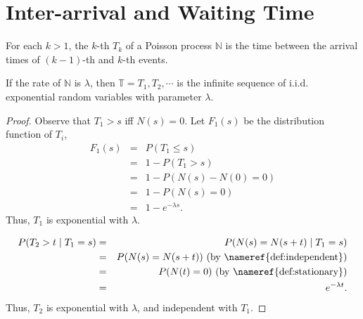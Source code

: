 \section{Inter-arrival and Waiting Time}

\begin{definition}
For each $ k > 1 $, the $ k $-th  $ T_{k} $ of a Poisson process $ \mathbb{N} $ is the time between the arrival times of $ (k - 1) $-th and $ k $-th events.
\end{definition}

\begin{observation} \label{obs:exp_with_lambda}
If the rate of $ \mathbb{N} $ is $ \lambda $, then $ \mathbb{T} = T_{1}, T_{2}, \cdots $ is the infinite sequence of i.i.d. exponential random variables with parameter $ \lambda $.

\begin{proof}
Observe that $ T_{1} > s $ iff $ N(s) = 0 $. Let $ F_{1}(s) $ be the distribution function of $ T_{i} $,
\begin{eqnarray*}
F_{1}(s)
  & = & P(T_{1} \le s) \\
  & = & 1 - P(T_{1} > s) \\
  & = & 1 - P(N(s) - N(0) = 0) \\
  & = & 1 - P(N(s) = 0) \\
  & = & 1 - e^{-\lambda s}.
\end{eqnarray*}
Thus, $ T_{1} $ is exponential with $ \lambda $.

\begin{eqnarray*}
P(T_{2} > t \mid T_{1} = s)
  & = & P(N(s) = N(s + t) \mid T_{1} = s) \\
  & = & P(N(s) = N(s + t)) \text{ (by \nameref{def:independent})} \\
  & = & P(N(t) = 0) \text{ (by \nameref{def:stationary})} \\
  & = & e^{-\lambda t}.
\end{eqnarray*}
Thus, $ T_{2} $ is exponential with $ \lambda $, and independent with $ T_{1} $.
\end{proof}
\end{observation}

